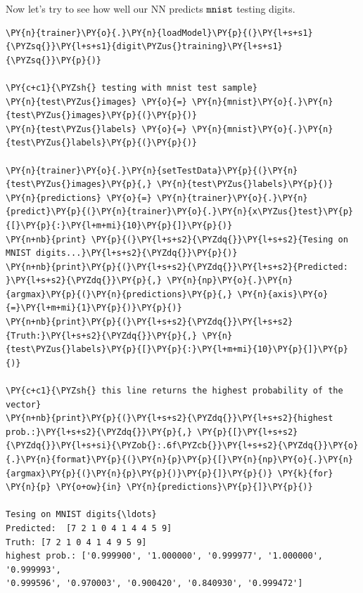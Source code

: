 Now let's try to see how well our NN predicts \(\tt{mnist}\) testing
digits.

\begin{tcolorbox}[breakable, size=fbox, boxrule=1pt, pad at break*=1mm,colback=cellbackground, colframe=cellborder]
\begin{Verbatim}[commandchars=\\\{\}]
\PY{n}{trainer}\PY{o}{.}\PY{n}{loadModel}\PY{p}{(}\PY{l+s+s1}{\PYZsq{}}\PY{l+s+s1}{digit\PYZus{}training}\PY{l+s+s1}{\PYZsq{}}\PY{p}{)}
	
\PY{c+c1}{\PYZsh{} testing with mnist test sample}
\PY{n}{test\PYZus{}images} \PY{o}{=} \PY{n}{mnist}\PY{o}{.}\PY{n}{test\PYZus{}images}\PY{p}{(}\PY{p}{)}
\PY{n}{test\PYZus{}labels} \PY{o}{=} \PY{n}{mnist}\PY{o}{.}\PY{n}{test\PYZus{}labels}\PY{p}{(}\PY{p}{)}
	
\PY{n}{trainer}\PY{o}{.}\PY{n}{setTestData}\PY{p}{(}\PY{n}{test\PYZus{}images}\PY{p}{,} \PY{n}{test\PYZus{}labels}\PY{p}{)}
\PY{n}{predictions} \PY{o}{=} \PY{n}{trainer}\PY{o}{.}\PY{n}{predict}\PY{p}{(}\PY{n}{trainer}\PY{o}{.}\PY{n}{x\PYZus{}test}\PY{p}{[}\PY{p}{:}\PY{l+m+mi}{10}\PY{p}{]}\PY{p}{)}
\PY{n+nb}{print} \PY{p}{(}\PY{l+s+s2}{\PYZdq{}}\PY{l+s+s2}{Tesing on MNIST digits...}\PY{l+s+s2}{\PYZdq{}}\PY{p}{)}
\PY{n+nb}{print}\PY{p}{(}\PY{l+s+s2}{\PYZdq{}}\PY{l+s+s2}{Predicted: }\PY{l+s+s2}{\PYZdq{}}\PY{p}{,} \PY{n}{np}\PY{o}{.}\PY{n}{argmax}\PY{p}{(}\PY{n}{predictions}\PY{p}{,} \PY{n}{axis}\PY{o}{=}\PY{l+m+mi}{1}\PY{p}{)}\PY{p}{)} 
\PY{n+nb}{print}\PY{p}{(}\PY{l+s+s2}{\PYZdq{}}\PY{l+s+s2}{Truth:}\PY{l+s+s2}{\PYZdq{}}\PY{p}{,} \PY{n}{test\PYZus{}labels}\PY{p}{[}\PY{p}{:}\PY{l+m+mi}{10}\PY{p}{]}\PY{p}{)}
	
\PY{c+c1}{\PYZsh{} this line returns the highest probability of the vector}
\PY{n+nb}{print}\PY{p}{(}\PY{l+s+s2}{\PYZdq{}}\PY{l+s+s2}{highest prob.:}\PY{l+s+s2}{\PYZdq{}}\PY{p}{,} \PY{p}{[}\PY{l+s+s2}{\PYZdq{}}\PY{l+s+si}{\PYZob{}:.6f\PYZcb{}}\PY{l+s+s2}{\PYZdq{}}\PY{o}{.}\PY{n}{format}\PY{p}{(}\PY{n}{p}\PY{p}{[}\PY{n}{np}\PY{o}{.}\PY{n}{argmax}\PY{p}{(}\PY{n}{p}\PY{p}{)}\PY{p}{]}\PY{p}{)} \PY{k}{for} \PY{n}{p} \PY{o+ow}{in} \PY{n}{predictions}\PY{p}{]}\PY{p}{)}

Tesing on MNIST digits{\ldots}
Predicted:  [7 2 1 0 4 1 4 4 5 9]
Truth: [7 2 1 0 4 1 4 9 5 9]
highest prob.: ['0.999900', '1.000000', '0.999977', '1.000000', '0.999993',
'0.999596', '0.970003', '0.900420', '0.840930', '0.999472']
\end{Verbatim}
\end{tcolorbox}

